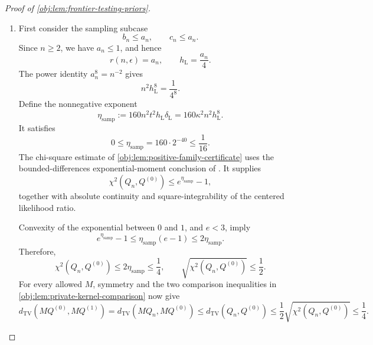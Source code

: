 \documentclass[11pt]{article}
\begin{document}
\begin{proof}[Proof of \cref{obj:lem:frontier-testing-priors}]
\begin{enumerate}
Choose the singleton null family \((P_0)\) and the alternative family
\((P_\lambda)_{\lambda\in\Lambda_{h_{\mathrm L}}}\) from
\cref{obj:def:cosine-family}. By
\cref{obj:lem:positive-family-certificate},
\[
P_0\in\mathcal P,\qquad \theta(P_0)=0,\qquad
P_\lambda\in\mathcal P,\qquad \theta(P_\lambda)=t=\Delta
\quad(\lambda\in\Lambda_{h_{\mathrm L}}).
\]
Their uniform product-law averages are
\[
\begin{aligned}
Q^{(0)}&=(P_0^{\mathrm{obs}})^{\otimes n},\\
Q^{(1)}
&=\frac1{|\Lambda_{h_{\mathrm L}}|}
  \sum_{\lambda\in\Lambda_{h_{\mathrm L}}}
  (P_\lambda^{\mathrm{obs}})^{\otimes n}\\
&=2^{-|\mathcal J_{h_{\mathrm L}}|}
  \sum_{\lambda\in\Lambda_{h_{\mathrm L}}}
  (P_\lambda^{\mathrm{obs}})^{\otimes n}
 =Q_n.
\end{aligned}
\]
The equality follows by enumerating every binary sign vector exactly once.

\item First consider the sampling subcase
\[
b_n\le a_n,\qquad c_n\le a_n.
\]
Since \(n\ge2\), we have \(a_n\le1\), and hence
\[
r(n,\epsilon)=a_n,\qquad
h_{\mathrm L}=\frac{a_n}{4}.
\]
The power identity \(a_n^8=n^{-2}\) gives
\[
n^2h_{\mathrm L}^{8}=\frac1{4^8}.
\]
Define the nonnegative exponent
\[
\eta_{\mathrm{samp}}
:=160n^2t^2h_{\mathrm L}\delta_{\mathrm L}
 =160\kappa^2n^2h_{\mathrm L}^{8}.
\]
It satisfies
\[
0\le\eta_{\mathrm{samp}}
 =160\cdot2^{-40}\le\frac1{16}.
\]
The chi-square estimate of
\cref{obj:lem:positive-family-certificate} uses the bounded-differences
exponential-moment conclusion of
\citep[Theorem~6.2, displayed log-mgf conclusion in its proof, p.~167]{BoucheronLugosiMassart2013}.
It supplies
\[
\chi^2(Q_n,Q^{(0)})\le e^{\eta_{\mathrm{samp}}}-1,
\]
together with absolute continuity and square-integrability of the centered
likelihood ratio.

Convexity of the exponential between \(0\) and \(1\), and \(e<3\), imply
\[
e^{\eta_{\mathrm{samp}}}-1
\le\eta_{\mathrm{samp}}(e-1)
\le2\eta_{\mathrm{samp}}.
\]
Therefore,
\[
\chi^2(Q_n,Q^{(0)})\le2\eta_{\mathrm{samp}}\le\frac14,
\qquad
\sqrt{\chi^2(Q_n,Q^{(0)})}\le\frac12.
\]
For every allowed \(M\), symmetry and the two comparison inequalities in
\cref{obj:lem:private-kernel-comparison} now give
\[
d_{\mathrm{TV}}(MQ^{(0)},MQ^{(1)})
=d_{\mathrm{TV}}(MQ_n,MQ^{(0)})
\le d_{\mathrm{TV}}(Q_n,Q^{(0)})
\le\frac12\sqrt{\chi^2(Q_n,Q^{(0)})}
\le\frac14.
\]


\end{enumerate}
\end{proof}
\end{document}
